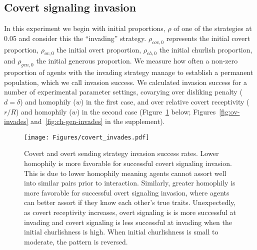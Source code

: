 \documentclass[11pt,letterpaper]{article}
\begin{document}



\subsection{Covert signaling invasion}

In this experiment we begin with initial proportions, $\rho$ of one of the strategies
at 0.05 and consider this the ``invading'' strategy. $\rho_{cov,0}$ represents
the initial covert proportion, $\rho_{ov,0}$ the initial overt proportion,
$\rho_{ch,0}$ the initial churlish proportion, and $\rho_{gen,0}$ the 
initial generous proportion. We measure how often
a non-zero proportion of agents with the invading strategy manage to 
establish a permanent population, which we call invasion success. We calculated
invasion success for a number of experimental parameter settings, covarying
over disliking penalty ($d=\delta$) and homophily ($w$) in the first case,
and over relative covert receptivity ($r/R$) and homophily ($w$) 
in the second case (Figure~\ref{fig:cov-invades} below; Figures~\ref{fig:ov-invades} and~\ref{fig:ch-gen-invades} in the supplement).

\begin{figure}[H]
  \centering
  \texttt{[image: Figures/covert\_invades.pdf]}
  \caption{Covert and overt sending strategy invasion success rates. 
    Lower homophily is more favorable for successful covert signaling invasion.
    This is due to lower homophily meaning agents cannot assort well into
    similar pairs prior to interaction.
    Similarly, greater homophily is more favorable for successful overt
    signaling invasion, where agents can better assort if they know each other's
    true traits. Unexpectedly, as covert receptivity increases, overt signaling
    is is more successful at invading and covert signaling is less successful
    at invading when the initial churlishness is high. When initial
    churlishness is small to moderate, the pattern is reversed.
  }
  \label{fig:cov-invades}
\end{figure}
\end{document}
